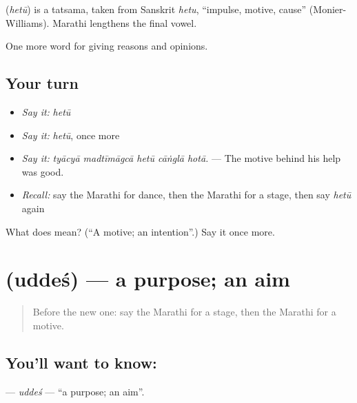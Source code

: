 \begin{cousinweb}
\textbf{} (\emph{hetū}) is a tatsama, taken from Sanskrit \emph{hetu}, \textquotedblleft{}impulse, motive, cause\textquotedblright{} (Monier-Williams). Marathi lengthens the final vowel.
\end{cousinweb}

\begin{grammarlens}[title={What you've built}]
One more word for giving reasons and opinions.
\end{grammarlens}

\subsection*{Your turn}
\begin{itemize}
\raggedright
  \item \emph{Say it:} \emph{hetū}
  \item \emph{Say it:} \emph{hetū}, once more
  \item \emph{Say it:} \emph{tyācyā madtīmāgcā hetū cāṅglā hotā.} — The motive behind his help was good.
  \item \emph{Recall:} say the Marathi for dance, then the Marathi for a stage, then say \emph{hetū} again
\end{itemize}

\begin{tcolorbox}[breakable,colback=teal!4,colframe=teal!35!black,title={Before you move on}]
What does  mean? (\textquotedblleft{}A motive; an intention\textquotedblright{}.) Say it once more.
\end{tcolorbox}
\section[\texorpdfstring{\mr{उद्देश} (uddeś)}{उद्देश (uddeś)}]{ (uddeś) — a purpose; an aim}

\label{lesson:MR-C342-uddes}



\begin{quote}
Before the new one: say the Marathi for a stage, then the Marathi for a motive.
\end{quote}

\subsection*{You'll want to know: }
\textbf{} — \emph{uddeś} — \textquotedblleft{}a purpose; an aim\textquotedblright{}.

